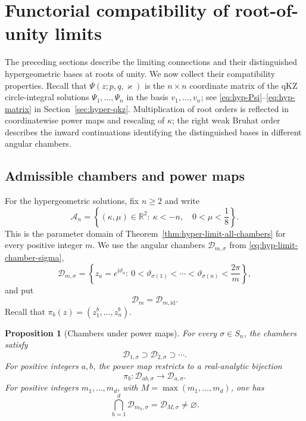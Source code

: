 \documentclass[12pt]{amsart}
\newtheorem{prop}[thm]{Proposition}
\theoremstyle{definition}
\numberwithin{equation}{section}
\theoremstyle{definition}
\let\mc\mathcal
\let\ka\kappa
\let\si\sigma
\let\ge\geqslant
\def\R{{\mathbb R}}
\def\beq{\begin{equation}}
\def\eeq{\end{equation}}
\begin{document}
\clearpage
\section{Functorial compatibility of root-of-unity limits}
\label{sec:admissible-composition}
\label{sec:functorial-compatibility}

The preceding sections describe the limiting connections and their
distinguished hypergeometric bases at roots of unity. We now collect
their compatibility properties. Recall that $\Psi(z;p,q,\varkappa)$
is the $n\times n$ coordinate matrix of the qKZ circle-integral
solutions $\Psi_1,\ldots,\Psi_n$ in the basis
$v_1,\ldots,v_n$; see \eqref{eq:hyp-Psi}--\eqref{eq:hyp-matrix}
in Section~\ref{sec:hyper-qkz}. Multiplication of root orders is
reflected in coordinatewise power maps and rescaling of $\ka$;
the right weak Bruhat order describes the inward continuations
identifying the distinguished bases in different angular chambers.

\subsection{Admissible chambers and power maps}
\label{subsec:functorial-chambers}

For the hypergeometric solutions, fix $n\ge2$ and write
\beq\label{eq:common-real-domain}
 \mc A_n=\left\{(\ka,\mu)\in\R^2:\
              \ka<-n,\quad 0<\mu<\frac18\right\}.
\eeq
This is the parameter domain of Theorem~\ref{thm:hyper-limit-all-chambers}
for every positive integer $m$. We use the angular chambers
$\mc D_{m,\si}$ from \eqref{eq:hyp-limit-chamber-sigma},
\[
 \mc D_{m,\si}=\left\{z_a=e^{\mathrm{i}\vartheta_a}:\
 0<\vartheta_{\si(1)}<\cdots<\vartheta_{\si(n)}
 <\frac{2\pi}{m}\right\},
\]
and put
\beq\label{eq:admissible-domain}
 \mc D_m=\mc D_{m,\mathrm{id}}.
\eeq
Recall that $\pi_b(z)=(z_1^b,\ldots,z_n^b)$.

\begin{prop}[Chambers under power maps]
\label{prop:admissible-domains}
For every $\si\in S_n$, the chambers satisfy
\beq\label{eq:nested-domains-sigma}
 \mc D_{1,\si}\supset\mc D_{2,\si}\supset\cdots.
\eeq
For positive integers $a,b$, the power map restricts to a
real-analytic bijection
\beq\label{eq:domain-power-map-sigma}
 \pi_b:\mc D_{ab,\si}\longrightarrow\mc D_{a,\si}.
\eeq
For positive integers $m_1,\ldots,m_d$, with
$M=\max(m_1,\ldots,m_d)$, one has
\beq\label{eq:domain-finite-intersection-sigma}
 \bigcap_{h=1}^d\mc D_{m_h,\si}=\mc D_{M,\si}\ne\varnothing.
\eeq
\end{prop}
\end{document}
